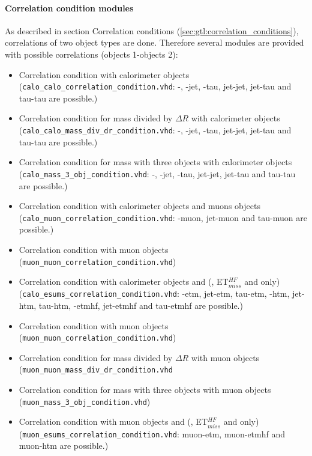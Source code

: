 \paragraph{Correlation condition modules}
\label{sec:gtl:correlation_condition_modules}

As described in section Correlation conditions (\ref{sec:gtl:correlation_conditions}), correlations of two object types are done. Therefore several modules are provided
with possible correlations (objects 1-objects 2):
\begin{itemize}
\item Correlation condition with calorimeter objects\\(\texttt{calo\_calo\_correlation\_condition.vhd}:
\egamma-\egamma, \egamma-jet, \egamma-tau, jet-jet, jet-tau and tau-tau are possible.)
\item Correlation condition for mass divided by $\Delta$$R$ with calorimeter objects\\(\texttt{calo\_calo\_mass\_div\_dr\_condition.vhd}:
\egamma-\egamma, \egamma-jet, \egamma-tau, jet-jet, jet-tau and tau-tau are possible.)
\item Correlation condition for mass with three objects with calorimeter objects\\(\texttt{calo\_mass\_3\_obj\_condition.vhd}:
\egamma-\egamma, \egamma-jet, \egamma-tau, jet-jet, jet-tau and tau-tau are possible.)
\item Correlation condition with calorimeter objects and muons objects\\(\texttt{calo\_muon\_correlation\_condition.vhd}: \egamma-muon, jet-muon and tau-muon are possible.)
\item Correlation condition with muon objects\\(\texttt{muon\_muon\_correlation\_condition.vhd})
\item Correlation condition with calorimeter objects and \esums (\etm, ET$_{miss}^{HF}$ and \htm only)\\(\texttt{calo\_esums\_correlation\_condition.vhd}: \egamma-etm, jet-etm, tau-etm, \egamma-htm, jet-htm, tau-htm, \egamma-etmhf, jet-etmhf and tau-etmhf are possible.)
\item Correlation condition with muon objects\\(\texttt{muon\_muon\_correlation\_condition.vhd})
\item Correlation condition for mass divided by $\Delta$$R$ with muon objects\\(\texttt{muon\_muon\_mass\_div\_dr\_condition.vhd}
\item Correlation condition for mass with three objects with muon objects\\(\texttt{muon\_mass\_3\_obj\_condition.vhd})
\item Correlation condition with muon objects and \esums (\etm, ET$_{miss}^{HF}$ and \htm only)\\(\texttt{muon\_esums\_correlation\_condition.vhd}: muon-etm, muon-etmhf and muon-htm are possible.)
\end{itemize}

